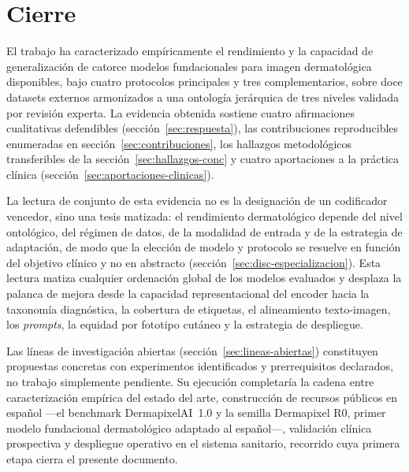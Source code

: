 \section{Cierre}
\label{sec:cierre}

El trabajo ha caracterizado empíricamente el rendimiento y la
capacidad de generalización de catorce modelos fundacionales para
imagen dermatológica disponibles, bajo cuatro protocolos
principales y tres complementarios, sobre doce datasets externos
armonizados a una ontología jerárquica de tres niveles validada
por revisión experta. La evidencia obtenida sostiene cuatro
afirmaciones cualitativas defendibles (sección~\ref{sec:respuesta}),
las contribuciones reproducibles enumeradas en
sección~\ref{sec:contribuciones}, los hallazgos metodológicos
transferibles de la sección~\ref{sec:hallazgos-conc} y cuatro
aportaciones a la práctica clínica
(sección~\ref{sec:aportaciones-clinicas}).

La lectura de conjunto de esta evidencia no es la designación de un
codificador vencedor, sino una tesis matizada: el rendimiento
dermatológico depende del nivel ontológico, del régimen de datos,
de la modalidad de entrada y de la estrategia de adaptación, de modo
que la elección de modelo y protocolo se resuelve en función del
objetivo clínico y no en abstracto
(sección~\ref{sec:disc-especializacion}). Esta lectura matiza
cualquier ordenación global de los modelos evaluados y desplaza la
palanca de mejora desde la capacidad representacional del encoder
hacia la taxonomía diagnóstica, la cobertura de etiquetas, el
alineamiento texto-imagen, los \emph{prompts}, la equidad por
fototipo cutáneo y la estrategia de despliegue.

Las líneas de investigación abiertas
(sección~\ref{sec:lineas-abiertas}) constituyen propuestas concretas con
experimentos identificados y prerrequisitos declarados, no trabajo
simplemente pendiente. Su ejecución completaría la cadena entre
caracterización empírica del estado del arte, construcción de
recursos públicos en español ---el benchmark DermapixelAI~1.0 y la
semilla Dermapixel R0, primer modelo fundacional dermatológico
adaptado al español---, validación clínica prospectiva y despliegue
operativo en el sistema sanitario, recorrido cuya primera etapa cierra
el presente documento.

